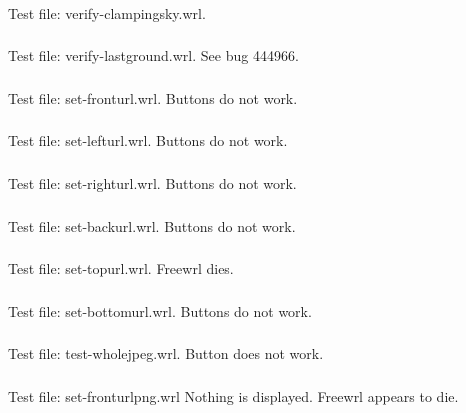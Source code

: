 \subsubsection{\BkgFa\BkgFb}
Test file: verify-clampingsky.wrl.

\subsubsection{\BkgGa\BkgGb}
Test file: verify-lastground.wrl.
See bug 444966.

\subsubsection{\BkgH}
Test file: set-fronturl.wrl.
Buttons do not work.

\subsubsection{\BkgI}
Test file: set-lefturl.wrl.
Buttons do not work.

\subsubsection{\BkgJ}
Test file: set-righturl.wrl.
Buttons do not work.

\subsubsection{\BkgK}
Test file: set-backurl.wrl.
Buttons do not work.

\subsubsection{\BkgL}
Test file: set-topurl.wrl.
Freewrl dies.

\subsubsection{\BkgM}
Test file: set-bottomurl.wrl.
Buttons do not work.

\subsubsection{\BkgN}
Test file: test-wholejpeg.wrl.
Button does not work.

\subsubsection{\BkgO}
Test file: set-fronturlpng.wrl
Nothing is displayed. Freewrl appears to die.

